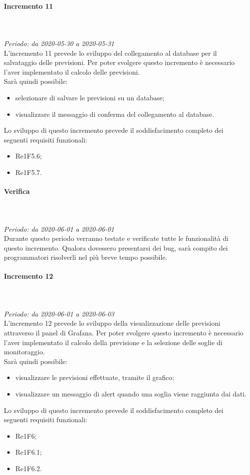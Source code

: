 \paragraph{Incremento 11}\mbox{} \\ \mbox{} \\ 
\textit{Periodo: da 2020-05-30 a 2020-05-31}\\
L’incremento 11 prevede lo sviluppo del collegamento al database per il salvataggio delle previsioni. Per poter svolgere questo incremento è necessario l'aver implementato il calcolo delle previsioni. \\
Sarà quindi possibile:
\begin{itemize}
	\item selezionare di salvare le previsioni su un database;
	\item visualizzare il messaggio di conferma del collegamento al database.
\end{itemize}
Lo sviluppo di questo incremento prevede il soddisfacimento completo dei seguenti requisiti funzionali:
\begin{itemize}
\item Re1F5.6;
\item Re1F5.7.
\end{itemize}
\paragraph*{Verifica}\mbox{} \\ \mbox{} \\ 
\textit{Periodo: da 2020-06-01 a 2020-06-01}\\
Durante questo periodo verranno testate e verificate tutte le funzionalità di questo incremento. Qualora dovessero presentarsi dei bug, sarà compito dei programmatori risolverli nel più breve tempo possibile.

\paragraph{Incremento 12}\mbox{} \\ \mbox{} \\ 
\textit{Periodo: da 2020-06-01 a 2020-06-03}\\
L’incremento 12 prevede lo sviluppo della visualizzazione delle previsioni attraverso il panel di Grafana. Per poter svolgere questo incremento è necessario l'aver implementato il calcolo della previsione e la selezione delle soglie di monitoraggio. \\
Sarà quindi possibile:
\begin{itemize}
	\item visualizzare le previsioni effettuate, tramite il grafico;
	\item visualizzare un messaggio di alert quando una soglia viene raggiunta dai dati.
\end{itemize}
Lo sviluppo di questo incremento prevede il soddisfacimento completo dei seguenti requisiti funzionali:
\begin{itemize}
\item Re1F6;
\item Re1F6.1;
\item Re1F6.2.
\end{itemize}
